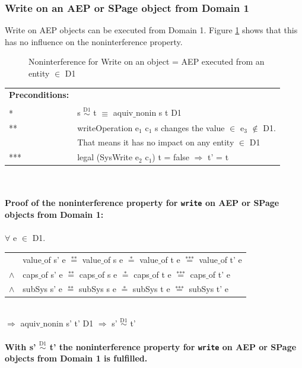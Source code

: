 \documentclass[11pt,a4paper,twoside]{article}
\begin{document}
{\subsubsection{Write on an AEP or SPage object from Domain 1}\label{WriteOut2}
Write on AEP objects can be executed from Domain 1. Figure \ref{fig:WriteOut2} shows that this has no influence on the noninterference property.
\begin{flushleft}
\begin{figure}[H]
\caption{Noninterference for Write on an object = AEP executed from an entity $\in$ D1}
\label{fig:WriteOut2}
\end{figure}
\end{flushleft}
\begin{tabular}{ll}
\textbf{Preconditions:} \\ \\
* & s $\overset{\text{D1}}{\sim}$ t $\equiv$ aquiv$\_$nonin s t D1	\\ 
** & writeOperation e$_1$ c$_1$ s changes the value $\in$ e$_3$ $\notin$ D1. \\
& That means it has no impact on any entity $\in$ D1 \\ 
*** & legal (SysWrite e$_2$ c$_1$) t = false $\Rightarrow$ t' = t
\end{tabular} \\ \\ 
\textbf{Proof of the noninterference property for \texttt{write} on AEP or SPage objects from Domain 1:}\\ \\
$\forall$ e $\in$ D1. \\
\begin{tabular}{ll}
& value$\_$of s' e $\overset{\text{**}}{=}$ value$\_$of s e $\overset{\text{*}}{=}$ value$\_$of t e $\overset{\text{***}}{=}$ value$\_$of t' e \\
$\wedge$ & caps$\_$of s' e $\overset{\text{**}}{=}$ caps$\_$of s e $\overset{\text{*}}{=}$ caps$\_$of t e $\overset{\text{***}}{=}$ caps$\_$of t' e \\
$\wedge$ & subSys s' e $\overset{\text{**}}{=}$ subSys s e $\overset{\text{*}}{=}$ subSys t e $\overset{\text{***}}{=}$ subSys t' e
\end{tabular} \\
$\Rightarrow$ aquiv$\_$nonin s' t' D1 $\Rightarrow$ s' $\overset{\text{D1}}{\sim}$ t'\\ \\
\textbf{With s' $\overset{\text{D1}}{\sim}$ t' the noninterference property for \texttt{write} on AEP or SPage objects from Domain 1 is fulfilled.}  
\clearpage
}
\end{document}
